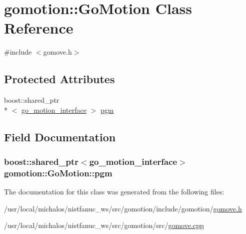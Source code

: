 \hypertarget{classgomotion_1_1_go_motion}{\section{gomotion\-:\-:Go\-Motion Class Reference}
\label{classgomotion_1_1_go_motion}
}


{\ttfamily \#include $<$gomove.\-h$>$}

\subsection*{Protected Attributes}
\begin{DoxyCompactItemize}
\item 
boost\-::shared\-\_\-ptr\\*
$<$ \hyperlink{structgomotion_1_1go__motion__interface}{go\-\_\-motion\-\_\-interface} $>$ \hyperlink{classgomotion_1_1_go_motion_a9d42007f05e5b2db5e423eb592520f55}{pgm}
\end{DoxyCompactItemize}


\subsection{Field Documentation}
\hypertarget{classgomotion_1_1_go_motion_a9d42007f05e5b2db5e423eb592520f55}{
\subsubsection[{pgm}]{\setlength{\rightskip}{0pt plus 5cm}boost\-::shared\-\_\-ptr$<${\bf go\-\_\-motion\-\_\-interface}$>$ gomotion\-::\-Go\-Motion\-::pgm\hspace{0.3cm}{\ttfamily [protected]}}}\label{classgomotion_1_1_go_motion_a9d42007f05e5b2db5e423eb592520f55}


The documentation for this class was generated from the following files\-:\begin{DoxyCompactItemize}
\item 
/usr/local/michalos/nistfanuc\-\_\-ws/src/gomotion/include/gomotion/\hyperlink{gomove_8h}{gomove.\-h}\item 
/usr/local/michalos/nistfanuc\-\_\-ws/src/gomotion/src/\hyperlink{gomove_8cpp}{gomove.\-cpp}\end{DoxyCompactItemize}
